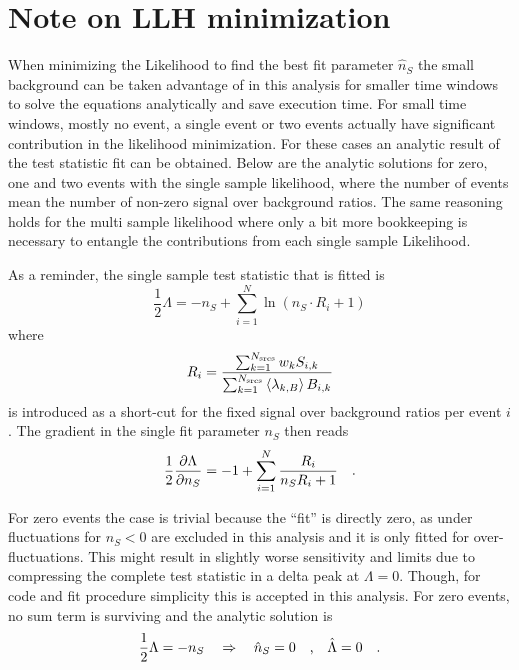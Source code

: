\section{Note on LLH minimization}
When minimizing the Likelihood to find the best fit parameter $\hat{n}_S$ the small background can be taken advantage of in this analysis for smaller time windows to solve the equations analytically and save execution time.
For small time windows, mostly no event, a single event or two events actually have significant contribution in the likelihood minimization.
For these cases an analytic result of the test statistic fit can be obtained.
Below are the analytic solutions for zero, one and two events with the single sample likelihood, where the number of events mean the number of non-zero signal over background ratios.
The same reasoning holds for the multi sample likelihood where only a bit more bookkeeping is necessary to entangle the contributions from each single sample Likelihood.

As a reminder, the single sample test statistic that is fitted is
\begin{equation}
  \frac{1}{2}\Lambda = -n_S + \sum_{i=1}^N \ln\left(n_S \cdot R_i + 1\right)
\end{equation}
where
\begin{equation}
  R_i = \frac{\sum_{k=1}^{N_\text{srcs}} w_k S_{i,k}}
             {\sum_{k=1}^{N_\text{srcs}}\Braket{\lambda_{k,B}} B_{i,k}}
\end{equation}
is introduced as a short-cut for the fixed signal over background ratios per event $i$.
The gradient in the single fit parameter $n_S$ then reads
\begin{equation}
  \frac{1}{2}\frac{\partial \Lambda}{\partial n_S}
  = -1 + \sum_{i=1}^N \frac{R_i}{n_S R_i + 1}
  \quad\text{.}
\end{equation}

For zero events the case is trivial because the \enquote{fit} is directly zero, as under fluctuations for $n_S < 0$ are excluded in this analysis and it is only fitted for over-fluctuations.
This might result in slightly worse sensitivity and limits due to compressing the complete test statistic in a delta peak at $\Lambda=0$.
Though, for code and fit procedure simplicity this is accepted in this analysis. 
For zero events, no sum term is surviving and the analytic solution is
\begin{equation}
  \frac{1}{2}\Lambda
  = -n_S \quad\Rightarrow\quad \hat{n}_S = 0\quad\text{,}\quad \hat{\Lambda} = 0
  \quad\text{.}
\end{equation}

